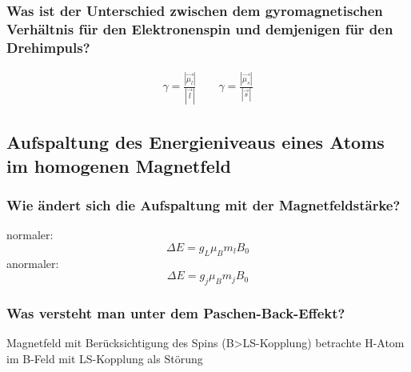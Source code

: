 \subsubsection{Was ist der Unterschied zwischen dem gyromagnetischen Verhältnis für den Elektronenspin und demjenigen für den Drehimpuls?}
\begin{align*}
    \gamma=\frac{|\vec{\mu_l}|}{|\vec{l}|} \qquad
    \gamma=\frac{|\vec{\mu_s}|}{|\vec{s}|}
\end{align*}


\subsection{Aufspaltung des Energieniveaus eines Atoms im homogenen Magnetfeld}


\subsubsection{Wie ändert sich die Aufspaltung mit der Magnetfeldstärke?}
normaler:
\begin{equation*}
    \Delta E=g_L \mu_B m_l B_0
\end{equation*}
anormaler:
\begin{equation*}
    \Delta E=g_j \mu_B m_j B_0
\end{equation*}


\subsubsection{Was versteht man unter dem Paschen-Back-Effekt?}
Magnetfeld mit Berücksichtigung des Spins (B>LS-Kopplung)
\to betrachte H-Atom im B-Feld mit LS-Kopplung als Störung


